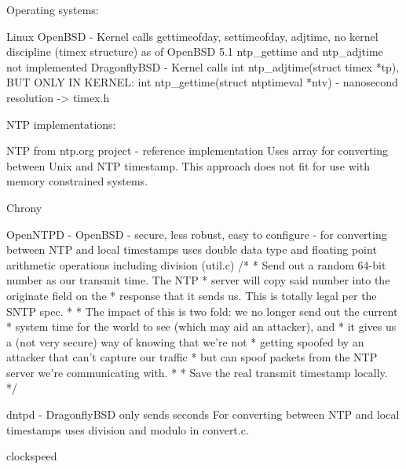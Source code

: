 Operating systems:

Linux
OpenBSD - Kernel calls gettimeofday, settimeofday, adjtime, no kernel discipline (timex structure)
as of OpenBSD 5.1 ntp\_gettime and ntp\_adjtime not implemented
DragonflyBSD - Kernel calls int ntp\_adjtime(struct timex *tp),
BUT ONLY IN KERNEL: int ntp\_gettime(struct ntptimeval *ntv) - nanosecond resolution -> timex.h

NTP implementations:

NTP from ntp.org project - reference implementation
Uses array for converting between Unix and NTP timestamp.
This approach does not fit for use with memory constrained systems.

Chrony

OpenNTPD - OpenBSD - secure, less robust, easy to configure - for converting between NTP and local timestamps uses double
data type and floating point arithmetic operations including division (util.c)
	/*
	 * Send out a random 64-bit number as our transmit time.  The NTP
	 * server will copy said number into the originate field on the
	 * response that it sends us.  This is totally legal per the SNTP spec.
	 *
	 * The impact of this is two fold: we no longer send out the current
	 * system time for the world to see (which may aid an attacker), and
	 * it gives us a (not very secure) way of knowing that we're not
	 * getting spoofed by an attacker that can't capture our traffic
	 * but can spoof packets from the NTP server we're communicating with.
	 *
	 * Save the real transmit timestamp locally.
	 */

dntpd - DragonflyBSD
only sends seconds
For converting between NTP and local timestamps uses division and modulo in convert.c.


clockspeed

